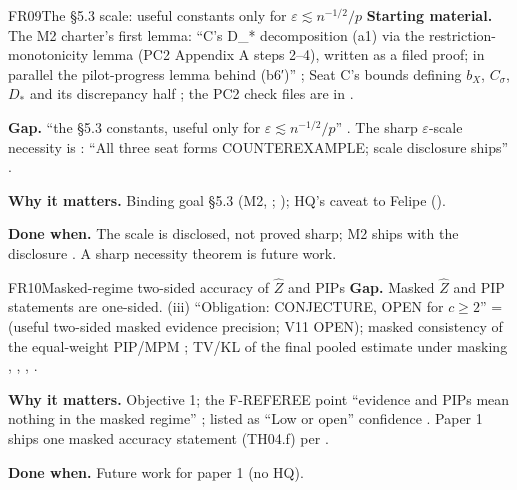 \begin{card}{FR09}{The §5.3 scale: useful constants only for $\varepsilon\lesssim n^{-1/2}/p$}
\textbf{Starting material.} The M2 charter's first lemma: ``C's D\_* decomposition (a1) via the restriction-monotonicity lemma (PC2 Appendix A steps 2–4), written as a filed proof; in parallel the pilot-progress lemma behind (b6′)'' ; Seat C's bounds defining $b_X$, $C_\sigma$, $D_*$  and its discrepancy half ; the PC2 check files are in .\par
\textbf{Gap.} ``the §5.3 constants, useful only for $\varepsilon\lesssim n^{-1/2}/p$'' . The sharp $\varepsilon$-scale necessity is : ``All three seat forms COUNTEREXAMPLE; scale disclosure ships'' .

\textbf{Why it matters.} Binding goal §5.3 (M2, ; ); HQ's caveat to Felipe  ().

\textbf{Done when.} The scale is disclosed, not proved sharp; M2 ships with the disclosure . A sharp necessity theorem is future work.
\end{card}

\begin{card}{FR10}{Masked-regime two-sided accuracy of $\hat Z$ and PIPs}
\textbf{Gap.} Masked $\hat Z$ and PIP statements are one-sided. (iii) ``Obligation: CONJECTURE, OPEN for $c\ge2$'' =  (useful two-sided masked evidence precision; V11 OPEN); masked consistency of the equal-weight PIP/MPM ; TV/KL of the final pooled estimate under masking  , , , .

\textbf{Why it matters.} Objective 1; the F-REFEREE point ``evidence and PIPs mean nothing in the masked regime'' ; listed as ``Low or open'' confidence . Paper 1 ships one masked accuracy statement (TH04.f) per .

\textbf{Done when.} Future work for paper 1 (no HQ).
\end{card}


